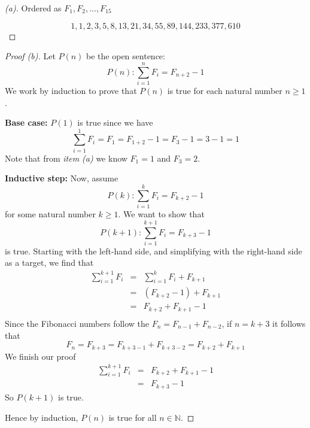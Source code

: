 \documentclass[12pt,oneside]{article}
\newcommand{\N}{\mathbb{N}}
\begin{document}
\begin{proof}[(a)]
Ordered as $F_1, F_2, ..., F_{15}$

\[1,1,2,3,5,8,13,21,34,55,89,144,233,377,610\]
\end{proof}

\begin{proof}[Proof (b)]
Let $P(n)$ be the open sentence:
\[P(n): \sum_{i=1}^{n}F_i = F_{n+2} - 1\]
We work by induction to prove that $P(n)$ is true for each natural number $n \geq 1$.

\textbf{Base case:} $P(1)$ is true since we have
\[\sum_{i=1}^{1}F_i = F_1 = F_{1+2} - 1 = F_3 - 1 = 3 - 1 = 1\]
Note that from \textit{item (a)} we know $F_1 = 1$ and $F_3 = 2$.

\textbf{Inductive step:} Now, assume
\[P(k): \sum_{i=1}^{k}F_i = F_{k+2} - 1\]
for some natural number $k \geq 1$. We want to show that
\[P(k+1): \sum_{i=1}^{k+1}F_i = F_{k+3} - 1\]
is true. Starting with the left-hand side, and simplifying with the right-hand side as a target, we find that
\begin{eqnarray*}
\sum_{i=1}^{k+1}F_i &=& \sum_{i=1}^{k}F_i + F_{k+1} \\
&=& (F_{k+2} - 1) + F_{k+1} \\
&=& F_{k+2} + F_{k+1} - 1 \\
\end{eqnarray*}
Since the Fibonacci numbers follow the $F_n = F_{n-1} + F_{n-2}$, if $n = k + 3$ it follows that
\[F_n = F_{k+3} = F_{k+3-1} + F_{k+3-2} = F_{k+2} + F_{k+1}\]
We finish our proof
\begin{eqnarray*}
\sum_{i=1}^{k+1}F_i &=& F_{k+2} + F_{k+1} - 1 \\
&=& F_{k+3} - 1
\end{eqnarray*}
So $P(k+1)$ is true.

Hence by induction, $P(n)$ is true for all $n \in \N$.
\end{proof}
\end{document}
